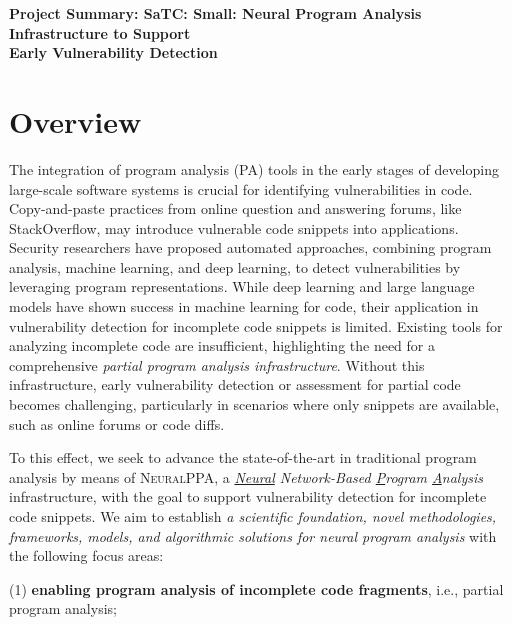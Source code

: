 \documentclass[11pt]{article}
\newcommand{\tool}{\textsc{NeuralPPA}\xspace}
\begin{document}



\begin{center}
  {\bf Project Summary: SaTC: Small: Neural Program Analysis Infrastructure to Support\\ Early Vulnerability Detection}
\end{center}
\vspace{-.1in}



\section{Overview}

The integration of program analysis (PA) tools in the early stages of
developing large-scale software systems is crucial for identifying
vulnerabilities in code. Copy-and-paste practices from online question
and answering forums, like StackOverflow, may introduce vulnerable
code snippets into applications. Security researchers have proposed
automated approaches, combining program analysis, machine learning,
and deep learning, to detect vulnerabilities by leveraging program
representations. While deep learning and large language models have
shown success in machine learning for code, their application in
vulnerability detection for incomplete code snippets is
limited. Existing tools for analyzing incomplete code are
insufficient, highlighting the need for a comprehensive
\textit{partial program analysis infrastructure}. Without this
infrastructure, early vulnerability detection or assessment for
partial code becomes challenging, particularly in scenarios where only
snippets are available, such as online forums or code diffs.

To this effect, we seek to advance the state-of-the-art in traditional program analysis by means of {\tool}, a {\em \underline{Neural} Network-Based \underline{P}rogram \underline{A}nalysis} infrastructure, with the goal to support vulnerability detection for incomplete code snippets. We aim to establish {\em a scientific foundation, novel methodologies, frameworks, models, and algorithmic solutions for neural program analysis} with the following focus areas:

(1) {\bf enabling program analysis of incomplete code fragments}, i.e., partial program analysis;

\end{document}

